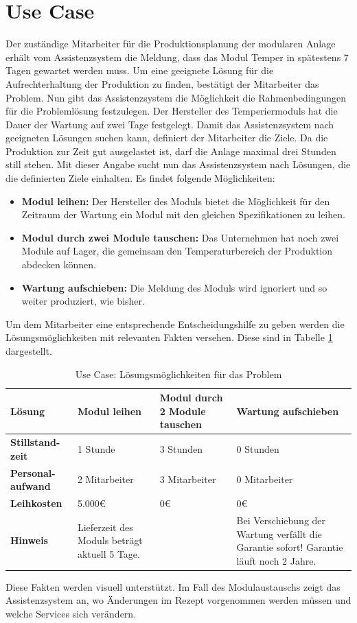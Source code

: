\section{Use Case}
Der zuständige Mitarbeiter für die Produktionsplanung der modularen Anlage erhält vom Assistenzsystem die Meldung, dass das Modul Temper in spätestens 7 Tagen gewartet werden muss. Um eine geeignete Lösung für die Aufrechterhaltung der Produktion zu finden, bestätigt der Mitarbeiter das Problem. Nun gibt das Assistenzsystem die Möglichkeit die Rahmenbedingungen für die Problemlösung festzulegen. Der Hersteller des Temperiermoduls hat die Dauer der Wartung auf zwei Tage festgelegt. Damit das Assistenzsystem nach geeigneten Lösungen suchen kann, definiert der Mitarbeiter die Ziele. Da die Produktion zur Zeit gut ausgelastet ist, darf die Anlage maximal drei Stunden still stehen. Mit dieser Angabe sucht nun das Assistenzsystem nach Lösungen, die die definierten Ziele einhalten. Es findet folgende Möglichkeiten:
\begin{itemize}
\item \textbf{Modul leihen:} Der Hersteller des Moduls bietet die Möglichkeit für den Zeitraum der Wartung ein Modul mit den gleichen Spezifikationen zu leihen.
\item \textbf{Modul durch zwei Module tauschen:} Das Unternehmen hat noch zwei Module auf Lager, die gemeinsam den Temperaturbereich der Produktion abdecken können.
\item \textbf{Wartung aufschieben:} Die Meldung des Moduls wird ignoriert und so weiter produziert, wie bisher.
\end{itemize}
Um dem Mitarbeiter eine entsprechende Entscheidungshilfe zu geben werden die Lösungsmöglichkeiten mit relevanten Fakten versehen. Diese sind in Tabelle \ref{tab:UseCase-Lösungen} dargestellt.

\begin{table}[htb]
\centering
\caption{Use Case: Lösungsmöglichkeiten für das Problem}
\begin{tabular}{p{}|p{}|p{}|p{}}
\textbf{Lösung} & Modul leihen & Modul durch 2 Module tauschen & Wartung aufschieben \\
\hline
\textbf{Stillstand-zeit} & 1 Stunde & 3 Stunden & 0 Stunden \\
\hline
\textbf{Personal-aufwand	} & 2 Mitarbeiter & 3 Mitarbeiter & 0 Mitarbeiter \\
\hline
\textbf{Leihkosten} & 5.000€ & 0€ & 0€ \\
\hline
\textbf{Hinweis} & Lieferzeit des Moduls beträgt aktuell 5 Tage. & & Bei Verschiebung der Wartung verfällt die Garantie sofort! Garantie läuft noch 2 Jahre. \\
\end{tabular}
\label{tab:UseCase-Lösungen}
\end{table}
Diese Fakten werden visuell unterstützt. Im Fall des Modulaustauschs zeigt das Assistenzsystem an, wo Änderungen im Rezept vorgenommen werden müssen und welche Services sich verändern.

